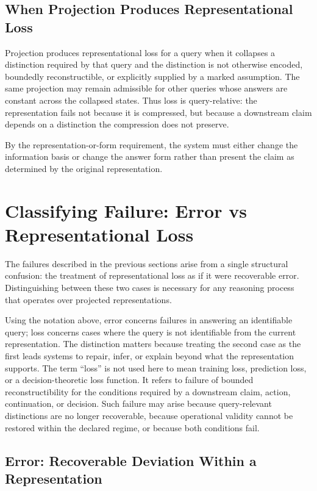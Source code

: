 \documentclass[11pt]{article}
\begin{document}
\subsection{When Projection Produces Representational Loss}

Projection produces representational loss for a query when it collapses a distinction required by that query and the distinction is not otherwise encoded, boundedly reconstructible, or explicitly supplied by a marked assumption. The same projection may remain admissible for other queries whose answers are constant across the collapsed states. Thus loss is query-relative: the representation fails not because it is compressed, but because a downstream claim depends on a distinction the compression does not preserve.

By the representation-or-form requirement, the system must either change the information basis or change the answer form rather than present the claim as determined by the original representation.

\section{Classifying Failure: Error vs Representational Loss}

The failures described in the previous sections arise from a single structural confusion: the treatment of representational loss as if it were recoverable error. Distinguishing between these two cases is necessary for any reasoning process that operates over projected representations.

Using the notation above, error concerns failures in answering an identifiable query; loss concerns cases where the query is not identifiable from the current representation. The distinction matters because treating the second case as the first leads systems to repair, infer, or explain beyond what the representation supports. The term ``loss'' is not used here to mean training loss, prediction loss, or a decision-theoretic loss function. It refers to failure of bounded reconstructibility for the conditions required by a downstream claim, action, continuation, or decision. Such failure may arise because query-relevant distinctions are no longer recoverable, because operational validity cannot be restored within the declared regime, or because both conditions fail.

\subsection{Error: Recoverable Deviation Within a Representation}
\end{document}
